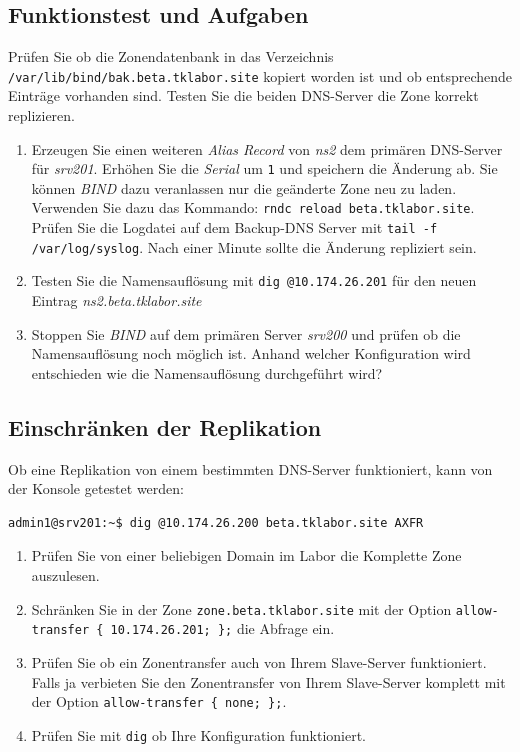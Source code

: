 \subsection{Funktionstest und Aufgaben}
Prüfen Sie ob die Zonendatenbank in das Verzeichnis
\texttt{/var/lib/bind/bak.beta.tklabor.site} kopiert worden ist und ob
entsprechende Einträge vorhanden sind. Testen Sie die beiden DNS-Server die Zone
korrekt replizieren.

\begin{enumerate}
  \item Erzeugen Sie einen weiteren \textit{Alias Record} von \textit{ns2} dem
  primären DNS-Server für \textit{srv201}. Erhöhen Sie die \textit{Serial} um
  \texttt{1} und speichern die Änderung ab. Sie können \textit{BIND} dazu
  veranlassen nur die geänderte Zone neu zu laden. Verwenden Sie dazu das
  Kommando: \texttt{rndc reload beta.tklabor.site}. Prüfen Sie die Logdatei auf
  dem Backup-DNS Server mit \texttt{tail -f /var/log/syslog}. Nach einer Minute
  sollte die Änderung repliziert sein.
  \item Testen Sie die Namensauflösung mit \texttt{dig @10.174.26.201} für den
  neuen Eintrag \textit{ns2.beta.tklabor.site}
  \item Stoppen Sie \textit{BIND} auf dem primären Server \textit{srv200} und
  prüfen ob die Namensauflösung noch möglich ist. Anhand welcher Konfiguration
  wird entschieden wie die Namensauflösung durchgeführt wird?
\end{enumerate}

\subsection{Einschränken der Replikation}
Ob eine Replikation von einem bestimmten DNS-Server funktioniert, kann von der
Konsole getestet werden:

\begin{lstlisting}
admin1@srv201:~$ dig @10.174.26.200 beta.tklabor.site AXFR
\end{lstlisting}

\begin{enumerate}
  \item Prüfen Sie von einer beliebigen Domain im Labor die Komplette Zone
  auszulesen.
  \item Schränken Sie in der Zone \texttt{zone.beta.tklabor.site} mit der Option
  \texttt{allow-transfer \{ 10.174.26.201; \};} die Abfrage ein.
  \item Prüfen Sie ob ein Zonentransfer auch von Ihrem Slave-Server
  funktioniert. Falls ja verbieten Sie den Zonentransfer von Ihrem Slave-Server
  komplett mit der Option \texttt{allow-transfer \{ none; \};}.
  \item Prüfen Sie mit \texttt{dig} ob Ihre Konfiguration funktioniert.
\end{enumerate}
